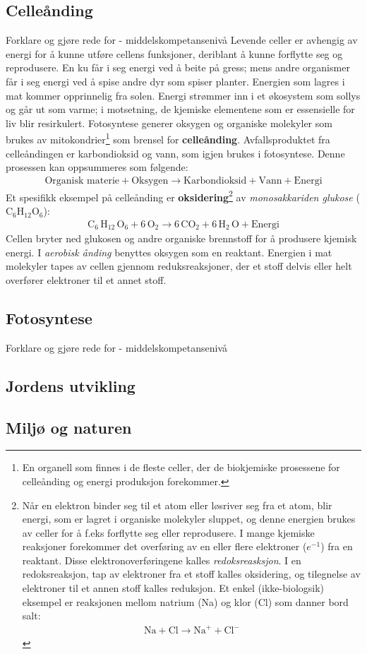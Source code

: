 \documentclass[main.tex]{subfiles}
\begin{document}
\subsection{Celleånding}
{\color{Blue}Forklare og gjøre rede for - middelskompetansenivå}
\newline\newline
Levende celler er avhengig av energi for å kunne utføre cellens funksjoner, deriblant å kunne forflytte seg og reprodusere. En ku får i seg energi ved å beite på gress; mens andre organismer får i seg energi ved å spise andre dyr som spiser planter. Energien som lagres i mat kommer opprinnelig fra solen. Energi strømmer inn i et økosystem som sollys og går ut som varme; i motsetning, de kjemiske elementene som er essensielle for liv blir resirkulert. Fotosyntese generer oksygen og organiske molekyler som brukes av mitokondrier\footnote{En organell som finnes i de fleste celler, der de biokjemiske prosessene for celleånding og energi produksjon forekommer.} som brensel for \textbf{celleånding}. Avfallsproduktet fra celleåndingen er karbondioksid og vann, som igjen brukes i fotosyntese. Denne prosessen kan oppsummeres som følgende:
\begin{align*}
\text{Organisk materie} + \text{Oksygen} \longrightarrow \text{Karbondioksid} + \text{Vann} + \text{Energi}
\end{align*}
Et spesifikk eksempel på celleånding er \textbf{oksidering}\footnote{
    Når en elektron binder seg til et atom eller løsriver seg fra et atom, blir energi, som er lagret i organiske molekyler sluppet, og denne energien brukes av celler for å f.eks forflytte seg eller reprodusere. I mange kjemiske reaksjoner forekommer det overføring av en eller flere elektroner ($e^{-1}$) fra en reaktant. Disse elektronoverføringene kalles \emph{redoksreasksjon}. I en redoksreaksjon, tap av elektroner fra et stoff kalles oksidering, og tilegnelse av elektroner til et annen stoff kalles reduksjon. Et enkel (ikke-biologsik) eksempel er reaksjonen mellom natrium (Na) og klor (Cl) som danner bord salt: 
    \begin{align*} 
        \text{Na} + \text{Cl} \longrightarrow \text{Na}^+ + \text{Cl}^-
    \end{align*}} 
av \emph{monosakkariden glukose} ($\text{C}_6 \text{H}_{12} \text{O}_6$):
\begin{align*}
\text{C}_6\, \text{H}_{12}\, \text{O}_6 + 6\, \text{O}_2 \longrightarrow 6\, \text{CO}_2 + 6\, \text{H}_2\, \text{O} + \text{Energi}
\end{align*}
Cellen bryter ned glukosen og andre organiske brennstoff for å produsere kjemisk energi. I \emph{aerobisk ånding} benyttes oksygen som en reaktant. Energien i mat molekyler tapes av cellen gjennom reduksreaksjoner, der et stoff delvis eller helt overfører elektroner til et annet stoff.

\subsection{Fotosyntese}
{\color{Blue}Forklare og gjøre rede for - middelskompetansenivå}

\subsection{Jordens utvikling}

\subsection{Miljø og naturen}
\end{document}
